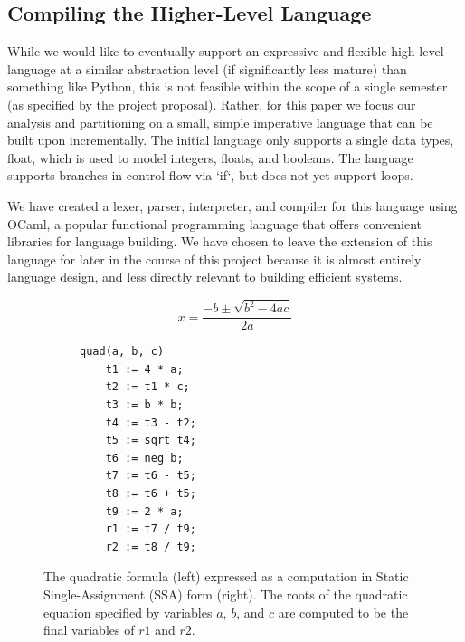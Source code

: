 \documentclass{sig-alternate-05-2015}
\begin{document}
\subsection{Compiling the Higher-Level Language}
While we would like to eventually support an expressive and flexible high-level language at a similar abstraction level (if significantly less mature) than something like Python, this is not feasible within the scope of a single semester (as specified by the project proposal). Rather, for this paper we focus our analysis and partitioning on a small, simple imperative language that can be built upon incrementally. The initial language only supports a single data types, float, which is used to model integers, floats, and booleans. The language supports branches in control flow via `if`, but does not yet support loops. 

We have created a lexer, parser, interpreter, and compiler for this language using OCaml, a popular functional programming language that offers convenient libraries for language building. We have chosen to leave the extension of this language for later in the course of this project because it is almost entirely language design, and less directly relevant to building efficient systems. 

\begin{figure}[t]
    \centering
    \label{fig:quad}
    \begin{subfigure}[c]{0.49\linewidth}
    \centering
      $$x=\frac{-b\pm\sqrt{b^2-4ac}}{2a}$$
    \end{subfigure}
    \begin{subfigure}[c]{0.49\linewidth}
    \centering
      \begin{verbatim}
quad(a, b, c)
    t1 := 4 * a;
    t2 := t1 * c;
    t3 := b * b;
    t4 := t3 - t2;
    t5 := sqrt t4;
    t6 := neg b;
    t7 := t6 - t5;
    t8 := t6 + t5;
    t9 := 2 * a;
    r1 := t7 / t9;
    r2 := t8 / t9;
    \end{verbatim}
    \end{subfigure}
    \caption{The quadratic formula (left) expressed as a computation in Static Single-Assignment (SSA) form (right). The roots of the quadratic equation specified by variables $a$, $b$, and $c$ are computed to be the final variables of $r1$ and $r2$.}
\end{figure}
\end{document}
